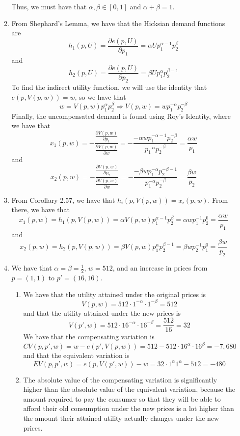 \documentclass[12pt]{article}
\begin{document}
\begin{enumerate}
\begin{enumerate}
		Thus, we must have that $\alpha,\beta \in [0,1]$ and $\alpha + \beta = 1$.
		\item From Shephard's Lemma, we have that the Hicksian demand functions are
		\[
		h_1(p,U) = \frac{\partial e(p,U)}{\partial p_1} = \alpha U p_1^{\alpha - 1} p_2^\beta
		\]
		and
		\[
		h_2(p,U) = \frac{\partial e(p,U)}{\partial p_2} = \beta U p_1^{\alpha} p_2^{\beta-1}
		\]
		To find the indirect utility function, we will use the identity that $e(p,V(p,w)) = w$, so we have that
		\[
		w = V(p,w) p_1^\alpha p_2^\beta \Longrightarrow V(p,w) = wp_1^{-\alpha}p_2^{-\beta}
		\]
		Finally, the uncompensated demand is found using Roy's Identity, where we have that
		\[
		x_1(p,w) = -\frac{\frac{\partial V(p,w)}{\partial p_1}}{\frac{\partial V(p,w)}{\partial w}} = -\frac{-\alpha w p_1^{-\alpha - 1}p_2^{-\beta}}{p_1^{-\alpha} p_2^{-\beta}} = \frac{\alpha w}{p_1}
		\]
		and
		\[
		x_2(p,w) = -\frac{\frac{\partial V(p,w)}{\partial p_2}}{\frac{\partial V(p,w)}{\partial w}} = -\frac{-\beta w p_1^{-\alpha}p_2^{-\beta-1}}{p_1^{-\alpha} p_2^{-\beta}} = \frac{\beta w}{p_2}
		\]
		\item From Corollary 2.57, we have that $h_i(p,V(p,w)) = x_i(p,w)$. From there, we have that
		\[
		x_1(p,w) = h_1(p,V(p,w)) = \alpha V(p,w) p_1^{\alpha - 1}p_2^{\beta} = \alpha w p_1^{-1} p_2^0 = \frac{\alpha w}{p_1}
		\]
		and
		\[
		x_2(p,w) = h_2(p,V(p,w)) = \beta V(p,w) p_1^{\alpha}p_2^{\beta-1} = \beta w p_2^{-1} p_1^0 = \frac{\beta w}{p_2}
		\]
		\item We have that $\alpha = \beta = \frac{1}{2}$, $w = 512$, and an increase in prices from $p = (1,1)$ to $p' = (16,16)$.
		\begin{enumerate}
			\item We have that the utility attained under the original prices is
			\[
			V(p,w) = 512 \cdot 1^{-\alpha} \cdot 1^{-\beta} = 512
			\]
			and that the utility attained under the new prices is
			\[
			V(p',w) = 512 \cdot 16^{-\alpha} \cdot 16^{-\beta} = \frac{512}{16} = 32
			\]
			We have that the compensating variation is
			\[
			CV(p,p',w) = w - e(p',V(p,w)) = 512 - 512 \cdot 16^{\alpha} \cdot 16^{\beta} = -7,680
			\]
			and that the equivalent variation is
			\[
			EV(p,p',w) = e(p,V(p',w)) - w = 32 \cdot 1^\alpha 1^\alpha - 512 = -480
			\]
			\item The absolute value of the compensating variation is significantly higher than the absolute value of the equivalent variation, because the amount required to pay the consumer so that they will be able to afford their old consumption under the new prices is a lot higher than the amount their attained utility actually changes under the new prices. 
			

\end{enumerate}
\end{enumerate}
\end{enumerate}
\end{document}
